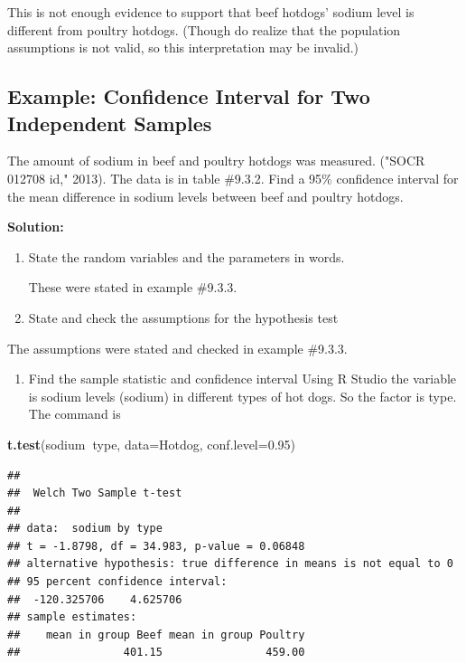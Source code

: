 \documentclass[
]{book}
\newenvironment{Shaded}{\begin{snugshade}}{\end{snugshade}}
\newcommand{\DataTypeTok}[1]{\textcolor[rgb]{0.13,0.29,0.53}{#1}}
\newcommand{\FloatTok}[1]{\textcolor[rgb]{0.00,0.00,0.81}{#1}}
\newcommand{\KeywordTok}[1]{\textcolor[rgb]{0.13,0.29,0.53}{\textbf{#1}}}
\newcommand{\NormalTok}[1]{#1}
\newcommand{\OperatorTok}[1]{\textcolor[rgb]{0.81,0.36,0.00}{\textbf{#1}}}
\providecommand{\tightlist}{%
  \setlength{\itemsep}{0pt}\setlength{\parskip}{0pt}}
\begin{document}
This is not enough evidence to support that beef hotdogs' sodium level is different from poultry hotdogs. (Though do realize that the population assumptions is not valid, so this interpretation may be invalid.)

\hypertarget{example-confidence-interval-for-two-independent-samples}{%
\subsection{Example: Confidence Interval for Two Independent Samples}\label{example-confidence-interval-for-two-independent-samples}}

The amount of sodium in beef and poultry hotdogs was measured. ("SOCR 012708 id," 2013). The data is in table \#9.3.2. Find a 95\% confidence interval for the mean difference in sodium levels between beef and poultry hotdogs.

\textbf{Solution:}

\begin{enumerate}
\def\labelenumi{\arabic{enumi}.}
\item
  State the random variables and the parameters in words.

  These were stated in example \#9.3.3.
\item
  State and check the assumptions for the hypothesis test
\end{enumerate}

The assumptions were stated and checked in example \#9.3.3.

\begin{enumerate}
\def\labelenumi{\arabic{enumi}.}
\setcounter{enumi}{2}
\tightlist
\item
  Find the sample statistic and confidence interval
  Using R Studio the variable is sodium levels (sodium) in different types of hot dogs. So the factor is type. The command is
\end{enumerate}

\begin{Shaded}
\begin{Highlighting}[]
\KeywordTok{t.test}\NormalTok{(sodium}\OperatorTok{~}\NormalTok{type, }\DataTypeTok{data=}\NormalTok{Hotdog, }\DataTypeTok{conf.level=}\FloatTok{0.95}\NormalTok{)}
\end{Highlighting}
\end{Shaded}

\begin{verbatim}
## 
##  Welch Two Sample t-test
## 
## data:  sodium by type
## t = -1.8798, df = 34.983, p-value = 0.06848
## alternative hypothesis: true difference in means is not equal to 0
## 95 percent confidence interval:
##  -120.325706    4.625706
## sample estimates:
##    mean in group Beef mean in group Poultry 
##                401.15                459.00
\end{verbatim}
\end{document}
